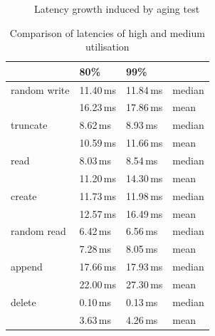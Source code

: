 \documentclass[
  color, %
  table, %
  lof,   %
  lot,   %
]{fithesis3}
\begin{document}
\begin{figure}
    \centering
    \caption{Latency growth induced by aging test}
    \label{fig:readtrunc99}
\end{figure}

\begin{table}
\centering
\caption{Comparison of latencies of high and medium utilisation}
\begin{tabular}{|l|l|l|l|}
\hline
 &80\% & 99\% &  \\
\hline
    random write & 11.40\,ms & 11.84\,ms & median \\
 \hline
                 & 16.23\,ms & 17.86\,ms& mean\\
    \hline
        truncate & 8.62\,ms & 8.93\,ms & median\\
    \hline
                 &  10.59\,ms & 11.66\,ms & mean \\
    \hline
            read &  8.03\,ms & 8.54\,ms & median\\
    \hline
                 & 11.20\,ms & 14.30\,ms & mean \\
    \hline
          create & 11.73\,ms & 11.98\,ms & median\\
    \hline
                 & 12.57\,ms & 16.49\,ms & mean \\
    \hline
     random read & 6.42\,ms &6.56\,ms& median\\
    \hline
                 & 7.28\,ms & 8.05\,ms & mean \\
    \hline
          append & 17.66\,ms & 17.93\,ms & median\\
    \hline
                 & 22.00\,ms & 27.30\,ms & mean \\
    \hline
          delete & 0.10\,ms & 0.13\,ms & median\\
    \hline
                & 3.63\,ms & 4.26\,ms & mean \\
    \hline
\end{tabular}
\label{tab:99_vs_80}
\end{table}
\end{document}
